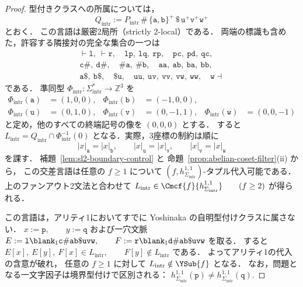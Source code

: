 \begin{proof}
型付きクラスへの所属については，
\[
 Q_{\mathrm{intr}}
 :=P_{\mathrm{intr}}\,\mathtt{\#}\,
   \{\mathtt a,\mathtt b\}^+\,
   \mathtt{\$}\,
   \mathtt u^+\mathtt v^+\mathtt w^+
\]
とおく．
この言語は厳密2局所（strictly 2-local）である．
両端の標識も含めた，許容する隣接対の完全な集合の一つは
\[
\begin{gathered}
 \vdash\mathtt l,\ \vdash\mathtt r,\quad
 \mathtt{lp},\ \mathtt{lq},\ \mathtt{rp},\quad
 \mathtt{pc},\ \mathtt{pd},\ \mathtt{qc},\\
 \mathtt{c\#},\ \mathtt{d\#},\quad
 \mathtt{\#a},\ \mathtt{\#b},\quad
 \mathtt{aa},\ \mathtt{ab},\ \mathtt{ba},\ \mathtt{bb},\\
 \mathtt{a\$},\ \mathtt{b\$},\quad
 \mathtt{\$u},\quad
 \mathtt{uu},\ \mathtt{uv},\ \mathtt{vv},\ \mathtt{vw},\
 \mathtt{ww},\quad
 \mathtt w\dashv
\end{gathered}
\]
である．
準同型
\(\Phi_{\mathrm{intr}}: \Sigma_{\mathrm{intr}}^*\to\mathbb Z^3\)
を
\[
\begin{aligned}
 \Phi_{\mathrm{intr}}(\mathtt a)&=(1,0,0),&
 \Phi_{\mathrm{intr}}(\mathtt b)&=(-1,0,0),\\
 \Phi_{\mathrm{intr}}(\mathtt u)&=(0,1,0),&
 \Phi_{\mathrm{intr}}(\mathtt v)&=(0,-1,1),&
 \Phi_{\mathrm{intr}}(\mathtt w)&=(0,0,-1)
\end{aligned}
\]
と定め，他のすべての終端記号の像を $(0,0,0)$ とする．
すると
\(L_{\mathrm{intr}} =Q_{\mathrm{intr}}\cap \Phi_{\mathrm{intr}}^{-1}(0)\)
となる．実際，3座標の制約は順に
\[
 |x|_{\mathtt a}=|x|_{\mathtt b},\qquad
 |x|_{\mathtt u}=|x|_{\mathtt v},\qquad
 |x|_{\mathtt v}=|x|_{\mathtt w}
\]
を課す．
補題~\ref{lem:sl2-boundary-control} と
命題~\ref{prop:abelian-coset-filter}(ii) から，
この交差言語は任意の $f\ge1$ について
$(f,h_{\Sigma_{\mathrm{intr}}}^{1,1})$-タプル代入可能である．
上のファンアウト2文法と合わせて
\(L_{\mathrm{intr}} \in\Cmcf{f}{h_{\Sigma_{\mathrm{intr}}}^{1,1}} \qquad(f\ge2)\)
が得られる．

この言語は，アリティ1においてすでに
Yoshinaka の自明型付けクラスに属さない．
\(x:=\mathtt p,\qquad y:=\mathtt q\)
および一穴文脈
\(E:=\mathtt l\blank_1\mathtt{c\#ab\$uvw}, \qquad F:=\mathtt r\blank_1\mathtt{d\#ab\$uvw}\)
を取る．
すると
\(E[x],\ E[y],\ F[x]\in L_{\mathrm{intr}}, \qquad F[y]\notin L_{\mathrm{intr}}\)
である．
よってアリティ1の代入の含意が破れ，
任意の $f\ge1$ に対して
$L_{\mathrm{intr}}\notin\YSub{f}$ となる．
なお，問題となる一文字因子は境界型付けで区別される：
\(h_{\Sigma_{\mathrm{intr}}}^{1,1}(\mathtt p) \ne h_{\Sigma_{\mathrm{intr}}}^{1,1}(\mathtt q).\)


\end{proof}
